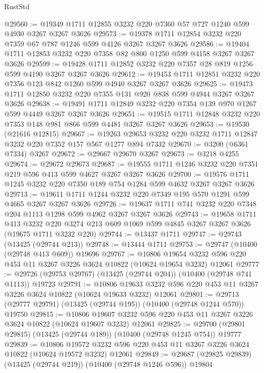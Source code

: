 \begin{lexlean}{RustStd}
\begin{coremodule}
{\begin{coremodule}
{{{{{{{{{{{{{{{{{{{{{{{{{@29560 := @19349 @1711 @12855 @3232 @220 @7360 @57 @727 @1240 @599 @4930 @3267 @3267 @3626
@29573 := @19378 @1711 @12854 @3232 @220 @7359 @67 @787 @1246 @599 @4126 @3267 @3267 @3626
@29586 := @19404 @1711 @12853 @3232 @220 @7358 @82 @800 @1250 @599 @4158 @3267 @3267 @3626
@29599 := @19428 @1711 @12852 @3232 @220 @7357 @28 @819 @1256 @599 @4190 @3267 @3267 @3626
@29612 := @19453 @1711 @12851 @3232 @220 @7356 @123 @842 @1260 @599 @4940 @3267 @3267 @3626
@29625 := @19473 @1711 @12850 @3232 @220 @7355 @131 @920 @838 @599 @4944 @3267 @3267 @3626
@29638 := @19491 @1711 @12849 @3232 @220 @7354 @139 @970 @1267 @599 @4449 @3267 @3267 @3626
@29651 := @19515 @1711 @12848 @3232 @220 @7353 @148 @981 @866 @599 @4481 @3267 @3267 @3626
@29653 := @19530 (@21616 @12815)
@29667 := @19263 @29653 @3232 @220 @3232 @1711 @12847 @3232 @220 @7352 @157 @567 @1277 @894 @7332
@29670 := @3200 (@6361 @7334) @3267
@29672 := @29667 @29670 @3267
@29673 := @3218 @4255
@29674 := @29672 @29673
@29687 := @19555 @1711 @1246 @3232 @220 @7351 @219 @596 @413 @599 @4627 @3267 @3267 @3626
@29700 := @19576 @1711 @1245 @3232 @220 @7350 @189 @754 @1284 @599 @4632 @3267 @3267 @3626
@29713 := @19611 @1711 @1244 @3232 @220 @7349 @195 @570 @1291 @599 @4665 @3267 @3267 @3626
@29726 := @19637 @1711 @741 @3232 @220 @7348 @204 @1113 @1298 @599 @4962 @3267 @3267 @3626
@29743 := @19658
    @1711
    @413
    @3232
    @220
    @3274
    @213
    @609
    @1069
    @599
    @4845
    @3267
    @3267
    @3626
    (@19675 @1711 @3232 @220)
@29744 := @13437 @1711
@29747 := @29743 (@13425 (@29744 @213))
@29748 := @13444 @1711
@29753 := @29747 (@10400 (@29748 @413 @609)) @19696
@29767 := @10806
    @19654
    @3232
    @596
    @220
    @453
    @11
    @3267
    @3226
    @3624
    @10822
    (@10624 @19654 @3232)
    @12061
@29777 := @29726 (@29753 @29767) (@13425 (@29744 @204)) (@10400 (@29748 @741 @1113)) @19723
@29791 := @10806
    @19633
    @3232
    @596
    @220
    @453
    @11
    @3267
    @3226
    @3624
    @10822
    (@10624 @19633 @3232)
    @12061
@29801 := @29713 (@29777 @29791) (@13425 (@29744 @195)) (@10400 (@29748 @1244 @570)) @19750
@29815 := @10806
    @19607
    @3232
    @596
    @220
    @453
    @11
    @3267
    @3226
    @3624
    @10822
    (@10624 @19607 @3232)
    @12061
@29825 := @29700 (@29801 @29815) (@13425 (@29744 @189)) (@10400 (@29748 @1245 @754)) @19777
@29839 := @10806
    @19572
    @3232
    @596
    @220
    @453
    @11
    @3267
    @3226
    @3624
    @10822
    (@10624 @19572 @3232)
    @12061
@29849 := @29687 (@29825 @29839) (@13425 (@29744 @219)) (@10400 (@29748 @1246 @596)) @19804
}}}}}}}}}}}}}}}}}}}}}}}}}
\end{coremodule}}
\end{coremodule}
\end{lexlean}
